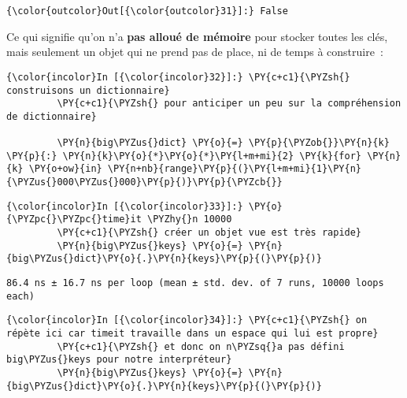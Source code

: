 \begin{Verbatim}[commandchars=\\\{\},frame=single,framerule=0.3mm,rulecolor=\color{cellframecolor}]
{\color{outcolor}Out[{\color{outcolor}31}]:} False
\end{Verbatim}
            
    Ce qui signifie qu'on n'a \textbf{pas alloué de mémoire} pour stocker
toutes les clés, mais seulement un objet qui ne prend pas de place, ni
de temps à construire~:

    \begin{Verbatim}[commandchars=\\\{\},frame=single,framerule=0.3mm,rulecolor=\color{cellframecolor}]
{\color{incolor}In [{\color{incolor}32}]:} \PY{c+c1}{\PYZsh{} construisons un dictionnaire}
         \PY{c+c1}{\PYZsh{} pour anticiper un peu sur la compréhension de dictionnaire}
         
         \PY{n}{big\PYZus{}dict} \PY{o}{=} \PY{p}{\PYZob{}}\PY{n}{k} \PY{p}{:} \PY{n}{k}\PY{o}{*}\PY{o}{*}\PY{l+m+mi}{2} \PY{k}{for} \PY{n}{k} \PY{o+ow}{in} \PY{n+nb}{range}\PY{p}{(}\PY{l+m+mi}{1}\PY{n}{\PYZus{}000\PYZus{}000}\PY{p}{)}\PY{p}{\PYZcb{}}
\end{Verbatim}


    \begin{Verbatim}[commandchars=\\\{\},frame=single,framerule=0.3mm,rulecolor=\color{cellframecolor}]
{\color{incolor}In [{\color{incolor}33}]:} \PY{o}{\PYZpc{}\PYZpc{}time}it \PYZhy{}n 10000
         \PY{c+c1}{\PYZsh{} créer un objet vue est très rapide}
         \PY{n}{big\PYZus{}keys} \PY{o}{=} \PY{n}{big\PYZus{}dict}\PY{o}{.}\PY{n}{keys}\PY{p}{(}\PY{p}{)}
\end{Verbatim}


    \begin{Verbatim}[commandchars=\\\{\},frame=single,framerule=0.3mm,rulecolor=\color{cellframecolor}]
86.4 ns ± 16.7 ns per loop (mean ± std. dev. of 7 runs, 10000 loops each)
\end{Verbatim}

    \begin{Verbatim}[commandchars=\\\{\},frame=single,framerule=0.3mm,rulecolor=\color{cellframecolor}]
{\color{incolor}In [{\color{incolor}34}]:} \PY{c+c1}{\PYZsh{} on répète ici car timeit travaille dans un espace qui lui est propre}
         \PY{c+c1}{\PYZsh{} et donc on n\PYZsq{}a pas défini big\PYZus{}keys pour notre interpréteur}
         \PY{n}{big\PYZus{}keys} \PY{o}{=} \PY{n}{big\PYZus{}dict}\PY{o}{.}\PY{n}{keys}\PY{p}{(}\PY{p}{)}
\end{Verbatim}


